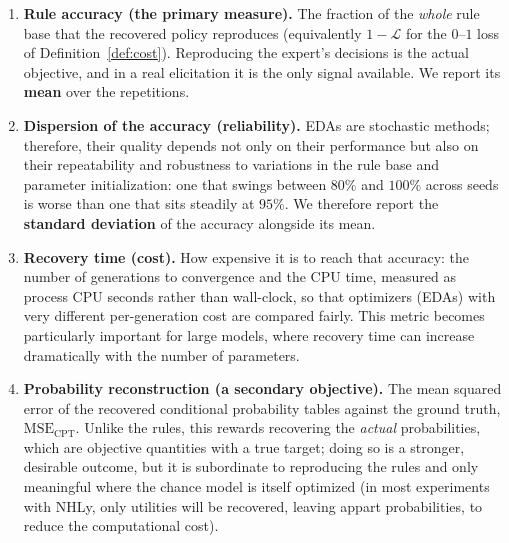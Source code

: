 \begin{enumerate}
  \item \textbf{Rule accuracy (the primary measure).} The fraction of the
        \emph{whole} rule base that the recovered policy reproduces (equivalently $1-\mathcal{L}$ for the $0$--$1$ loss of
        Definition~\ref{def:cost}). Reproducing the expert's decisions is the actual objective, and in a real elicitation it is the only signal available. We report its \textbf{mean} over the
        repetitions.
  \item \textbf{Dispersion of the accuracy (reliability).} EDAs are stochastic methods; therefore, their quality depends not only on their performance but also on their repeatability and robustness to variations in the rule base and parameter initialization: one
        that swings between $80\%$ and $100\%$ across seeds is worse than
        one that sits steadily at $95\%$. We therefore report the
        \textbf{standard deviation} of the accuracy alongside its mean.
  \item \textbf{Recovery time (cost).} How expensive it is to reach that
        accuracy: the number of generations to convergence and the CPU
        time, measured as process CPU seconds rather
        than wall-clock, so that optimizers (EDAs) with very different
        per-generation cost are compared fairly. This metric becomes particularly important for large models, where recovery time can increase dramatically with the number of parameters.

        
  \item \textbf{Probability reconstruction (a secondary objective).} The
        mean squared error of the recovered conditional probability
        tables against the ground truth, $\mathrm{MSE}_{\text{CPT}}$.
        Unlike the rules, this rewards recovering the \emph{actual}
        probabilities, which are objective quantities with a true target;
        doing so is a stronger, desirable outcome, but it is subordinate
        to reproducing the rules and only meaningful where the chance
        model is itself optimized (in most experiments with NHLy, only utilities will be recovered, leaving appart probabilities, to reduce the computational cost).
\end{enumerate}

